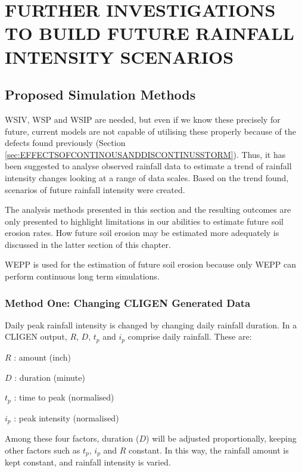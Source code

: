 
\chapter{FURTHER INVESTIGATIONS TO BUILD FUTURE RAINFALL INTENSITY SCENARIOS}
\label{sec:FurtherInvestigationstoBuildFutureRainfallIntensityScenarios}

\section{Proposed Simulation Methods}
\label{sec:ProposedSimulationMethods}

WSIV, WSP and WSIP are needed, but even if we know these precisely for future,
current models are not capable of utilising these properly because of the
defects found previously (Section
\ref{sec:EFFECTSOFCONTINOUSANDDISCONTINUSSTORM}). Thus, it has been suggested to
analyse observed rainfall data to estimate a trend of rainfall intensity changes
looking at a range of data scales. Based on the trend found, scenarios of future
rainfall intensity were created.

The analysis methods presented in this section and the resulting outcomes are
only presented to highlight limitations in our abilities to estimate future soil
erosion rates. How future soil erosion may be estimated more adequately is
discussed in the latter section of this chapter.

WEPP is used for the estimation of future soil erosion because only WEPP can
perform continuous long term simulations.

\subsection{Method One: Changing CLIGEN Generated Data}
\label{sec:MethodOne}

Daily peak rainfall intensity is changed by changing daily rainfall duration.
In a CLIGEN output, $R$, $D$, $t_p$ and $i_p$ comprise daily rainfall. These
are:
\begin{itemize*}
  \item $R$ : amount (inch)
  \item $D$ : duration (minute)
  \item $t_p$ : time to peak (normalised)
  \item $i_p$ : peak intensity (normalised)
\end{itemize*}
Among these four factors, duration ($D$) will be adjusted proportionally,
keeping other factors such as $t_p$, $i_p$ and $R$ constant. In this way, the
rainfall amount is kept constant, and rainfall intensity is varied.

